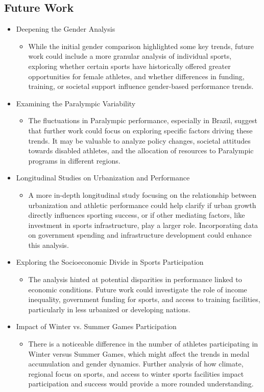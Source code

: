 \documentclass{article}
\begin{document}
\subsection{Future Work}

\begin{itemize}
    \item Deepening the Gender Analysis
    \begin{itemize}
        \item While the initial gender comparison highlighted some key trends, future work could include a more granular analysis of individual sports, exploring whether certain sports have historically offered greater opportunities for female athletes, and whether differences in funding, training, or societal support influence gender-based performance trends.
    \end{itemize}
    \item Examining the Paralympic Variability
    \begin{itemize}
        \item The fluctuations in Paralympic performance, especially in Brazil, suggest that further work could focus on exploring specific factors driving these trends. It may be valuable to analyze policy changes, societal attitudes towards disabled athletes, and the allocation of resources to Paralympic programs in different regions.
    \end{itemize}
    \item Longitudinal Studies on Urbanization and Performance
    \begin{itemize}
        \item A more in-depth longitudinal study focusing on the relationship between urbanization and athletic performance could help clarify if urban growth directly influences sporting success, or if other mediating factors, like investment in sports infrastructure, play a larger role. Incorporating data on government spending and infrastructure development could enhance this analysis.
    \end{itemize}
    \item Exploring the Socioeconomic Divide in Sports Participation
    \begin{itemize}
        \item The analysis hinted at potential disparities in performance linked to economic conditions. Future work could investigate the role of income inequality, government funding for sports, and access to training facilities, particularly in less urbanized or developing nations.
    \end{itemize}
    \item Impact of Winter vs. Summer Games Participation
    \begin{itemize}
        \item There is a noticeable difference in the number of athletes participating in Winter versus Summer Games, which might affect the trends in medal accumulation and gender dynamics. Further analysis of how climate, regional focus on sports, and access to winter sports facilities impact participation and success would provide a more rounded understanding.
    \end{itemize}
\end{itemize}



\end{document}
